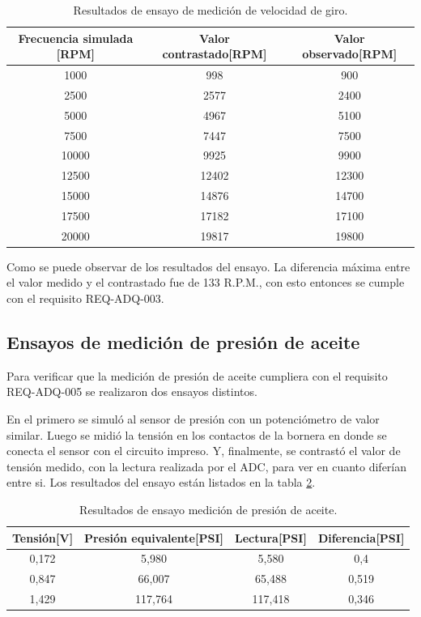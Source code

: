 \begin{table}[htpb]
	\centering
	\caption{Resultados de ensayo de medición de velocidad de giro.}
	\centering
	\begin{tabular}{c c c}    
		\toprule
		\textbf{Frecuencia simulada [RPM]} &  \textbf{Valor contrastado[RPM]}   & \textbf{Valor observado[RPM]} \\
		\midrule
		1000	&	998 &	900 \\
		2500	&	2577 & 2400 \\
		5000	&	4967 & 5100 \\
		7500	&	7447 & 7500 \\
		10000	&	9925 & 9900 \\
		12500	&	12402 & 12300 \\
		15000	&	14876 & 14700 \\
		17500	&	17182 & 17100 \\
		20000	&	19817 & 19800 \\		
		\bottomrule
	\end{tabular}
	\label{tab:ensayo-rpm}
\end{table}

Como se puede observar de los resultados del ensayo. La diferencia máxima entre el valor medido y el contrastado fue de 133 R.P.M., con esto entonces se cumple con el requisito REQ-ADQ-003.

\break

\subsection{Ensayos de medición de presión de aceite}

Para verificar que la medición de presión de aceite cumpliera con el requisito REQ-ADQ-005 se realizaron dos ensayos distintos.

En el primero se simuló al sensor de presión con un potenciómetro de valor similar. Luego se midió la tensión en los contactos de la bornera en donde se conecta el sensor con el circuito impreso. Y, finalmente, se contrastó el valor de tensión medido, con la lectura realizada por el ADC, para ver en cuanto diferían entre si. Los resultados del ensayo están listados en la tabla \ref{tab:ensayo-presion}.

\begin{table}[htpb]
	\centering
	\caption{Resultados de ensayo medición de presión de aceite.}
	\centering
	\begin{tabular}{c c c c}    
		\toprule
		\textbf{Tensión[V]} & \textbf{Presión equivalente[PSI]} & \textbf{Lectura[PSI]} & \textbf{Diferencia[PSI]}\\
		\midrule
		0,172		&   5,980 & 5,580 & 0,4 \\
		0,847		&   66,007 & 65,488 & 0,519 \\
		1,429		&   117,764 & 117,418 & 0,346 \\
		\bottomrule
	\end{tabular}
	\label{tab:ensayo-presion}
\end{table}

